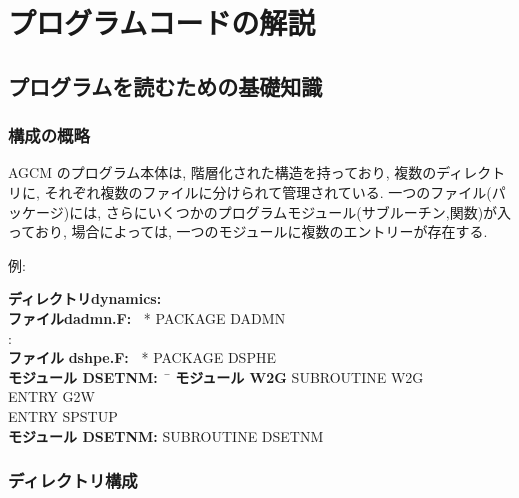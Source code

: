 ﻿
\section{プログラムコードの解説}

\subsection{プログラムを読むための基礎知識}

\subsubsection{構成の概略}

AGCM のプログラム本体は, 階層化された構造を持っており,
複数のディレクトリに, それぞれ複数のファイルに分けられて管理されている.
一つのファイル(パッケージ)には, 
さらにいくつかのプログラムモジュール(サブルーチン,関数)が入っており,
場合によっては, 一つのモジュールに複数のエントリーが存在する.

例: 
\begin{tabbing}
{\bf ディレクトリ}\= {\bf dynamics:\ } \\
 \> {\bf ファイル}\= {\bf dadmn.F:\ } 
                       * PACKAGE DADMN \\
 \>               \> : \\          
 \> {\bf ファイル} \= {\bf dshpe.F:\ } 
                       * PACKAGE DSPHE \\
 \>\> {\bf モジュール DSETNM:\ } \=  \kill
 \>\> {\bf モジュール W2G} 
                      \> SUBROUTINE W2G \\
 \>\>                 \> ENTRY      G2W \\
 \>\>                 \> ENTRY      SPSTUP \\
 \>\> {\bf モジュール DSETNM:} \>  SUBROUTINE DSETNM  \\
\end{tabbing}

\subsubsection{ディレクトリ構成}

